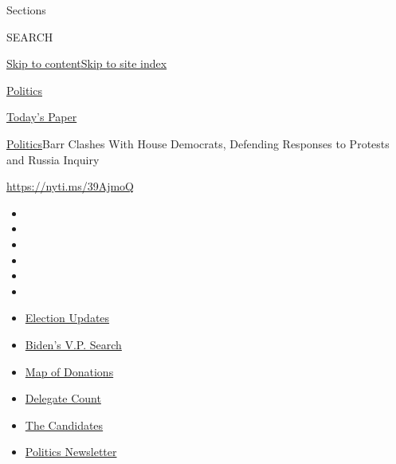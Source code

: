 Sections

SEARCH

\protect\hyperlink{site-content}{Skip to
content}\protect\hyperlink{site-index}{Skip to site index}

\href{https://www.nytimes3xbfgragh.onion/section/politics}{Politics}

\href{https://myaccount.nytimes3xbfgragh.onion/auth/login?response_type=cookie\&client_id=vi}{}

\href{https://www.nytimes3xbfgragh.onion/section/todayspaper}{Today's
Paper}

\href{/section/politics}{Politics}\textbar{}Barr Clashes With House
Democrats, Defending Responses to Protests and Russia Inquiry

\url{https://nyti.ms/39AjmoQ}

\begin{itemize}
\item
\item
\item
\item
\item
\item
\end{itemize}

\begin{itemize}
\item
  \href{https://www.nytimes3xbfgragh.onion/2020/08/03/us/elections/biden-vs-trump.html?action=click\&pgtype=Article\&state=default\&region=TOP_BANNER\&context=storylines_menu}{Election
  Updates}
\item
  \href{https://www.nytimes3xbfgragh.onion/article/biden-vice-president-2020.html?action=click\&pgtype=Article\&state=default\&region=TOP_BANNER\&context=storylines_menu}{Biden's
  V.P. Search}
\item
  \href{https://www.nytimes3xbfgragh.onion/interactive/2020/07/24/us/politics/trump-biden-campaign-donors.html?action=click\&pgtype=Article\&state=default\&region=TOP_BANNER\&context=storylines_menu}{Map
  of Donations}
\item
  \href{https://www.nytimes3xbfgragh.onion/interactive/2020/us/elections/delegate-count-primary-results.html?action=click\&pgtype=Article\&state=default\&region=TOP_BANNER\&context=storylines_menu}{Delegate
  Count}
\item
  \href{https://www.nytimes3xbfgragh.onion/interactive/2019/us/politics/2020-presidential-candidates.html?action=click\&pgtype=Article\&state=default\&region=TOP_BANNER\&context=storylines_menu}{The
  Candidates}
\item
  \href{https://www.nytimes3xbfgragh.onion/newsletters/politics?action=click\&pgtype=Article\&state=default\&region=TOP_BANNER\&context=storylines_menu}{Politics
  Newsletter}
\end{itemize}

